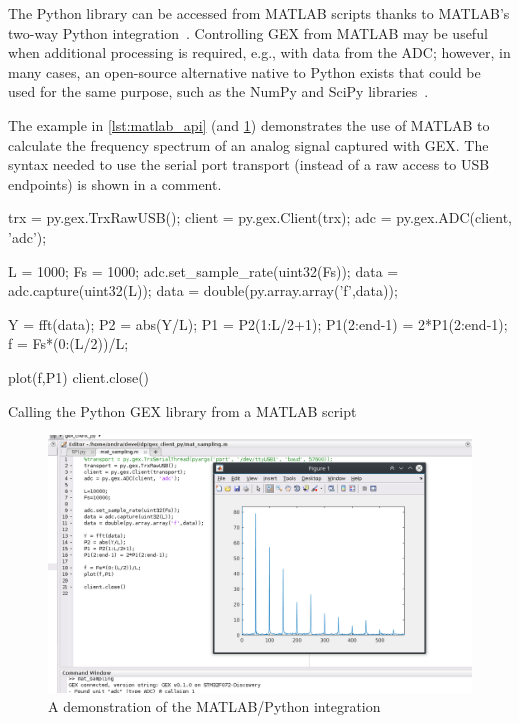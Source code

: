 The Python library can be accessed from MATLAB scripts thanks to MATLAB's two-way Python integration~\cite{matlabpy}. Controlling GEX from MATLAB may be useful when additional processing is required, e.g., with data from the \gls{ADC}; however, in many cases, an open-source alternative native to Python exists that could be used for the same purpose, such as the NumPy and SciPy libraries~\cite{numpyscipy}.

The example in \cref{lst:matlab_api} (and \cref{fig:matlabpic}) demonstrates the use of MATLAB to calculate the frequency spectrum of an analog signal captured with GEX. The syntax needed to use the serial port transport (instead of a raw access to USB endpoints) is shown in a comment.

\begin{listing}
	\begin{matlabcode}
	
	trx = py.gex.TrxRawUSB();
	client = py.gex.Client(trx);
	adc = py.gex.ADC(client, 'adc');
	
	L = 1000; Fs = 1000;
	adc.set_sample_rate(uint32(Fs)); %
	data = adc.capture(uint32(L));
	data = double(py.array.array('f',data)); %
	
	Y = fft(data);
	P2 = abs(Y/L);
	P1 = P2(1:L/2+1);
	P1(2:end-1) = 2*P1(2:end-1);
	f = Fs*(0:(L/2))/L;
	
	plot(f,P1)
	client.close()
	\end{matlabcode}
	\caption{\label{lst:matlab_api} Calling the Python GEX library from a MATLAB script}
\end{listing}

\begin{figure}
	\centering
	\includegraphics[width=\textwidth]{img/matlab-fft.png}
	\caption{A demonstration of the MATLAB/Python integration}
	\label{fig:matlabpic}
\end{figure}

